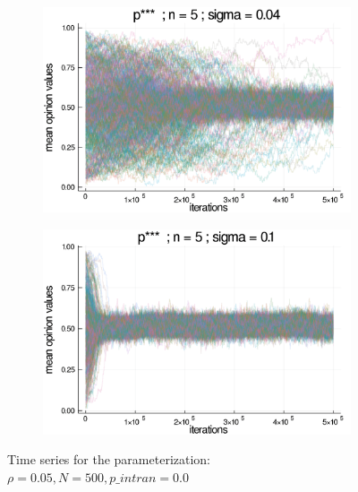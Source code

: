 \documentclass{article}
\begin{document}
{\begin{figure}[H]
      \begin{subfigure}[b]{0.48\textwidth}
        \includegraphics[width=\textwidth]{img/series/tseries2/Poodlcalculatepsssn5-rho005-sigma004-00intransrandom.png}
      \end{subfigure}

      \begin{subfigure}[b]{0.48\textwidth}
        \includegraphics[width=\textwidth]{img/series/tseries2/Poodlcalculatepsssn5-rho005-sigma01-00intransrandom.png}
      \end{subfigure}
      \caption{Time series for the parameterization: \(\rho = 0.05, N = 500,
        p\_intran = 0.0\)}
            \label{fig:tseries2}
          \end{figure}

}
\end{document}
